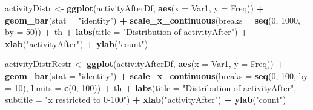 \documentclass[10pt,]{scrartcl}
\newenvironment{Shaded}{\begin{snugshade}}{\end{snugshade}}
\newcommand{\KeywordTok}[1]{\textcolor[rgb]{0.13,0.29,0.53}{\textbf{#1}}}
\newcommand{\DataTypeTok}[1]{\textcolor[rgb]{0.13,0.29,0.53}{#1}}
\newcommand{\DecValTok}[1]{\textcolor[rgb]{0.00,0.00,0.81}{#1}}
\newcommand{\StringTok}[1]{\textcolor[rgb]{0.31,0.60,0.02}{#1}}
\newcommand{\OperatorTok}[1]{\textcolor[rgb]{0.81,0.36,0.00}{\textbf{#1}}}
\newcommand{\NormalTok}[1]{#1}
\begin{document}
\begin{Shaded}
\begin{Highlighting}[]
\NormalTok{activityDistr <-}\StringTok{ }\KeywordTok{ggplot}\NormalTok{(activityAfterDf, }\KeywordTok{aes}\NormalTok{(}\DataTypeTok{x =}\NormalTok{ Var1, }\DataTypeTok{y =}\NormalTok{ Freq)) }\OperatorTok{+}
\StringTok{    }\KeywordTok{geom_bar}\NormalTok{(}\DataTypeTok{stat =} \StringTok{"identity"}\NormalTok{) }\OperatorTok{+}\StringTok{ }\KeywordTok{scale_x_continuous}\NormalTok{(}\DataTypeTok{breaks =} \KeywordTok{seq}\NormalTok{(}\DecValTok{0}\NormalTok{,}
    \DecValTok{1000}\NormalTok{, }\DataTypeTok{by =} \DecValTok{50}\NormalTok{)) }\OperatorTok{+}\StringTok{ }\NormalTok{th }\OperatorTok{+}\StringTok{ }\KeywordTok{labs}\NormalTok{(}\DataTypeTok{title =} \StringTok{"Distribution of activityAfter"}\NormalTok{) }\OperatorTok{+}
\StringTok{    }\KeywordTok{xlab}\NormalTok{(}\StringTok{"activityAfter"}\NormalTok{) }\OperatorTok{+}\StringTok{ }\KeywordTok{ylab}\NormalTok{(}\StringTok{"count"}\NormalTok{)}

\NormalTok{activityDistrRestr <-}\StringTok{ }\KeywordTok{ggplot}\NormalTok{(activityAfterDf, }\KeywordTok{aes}\NormalTok{(}\DataTypeTok{x =}\NormalTok{ Var1, }\DataTypeTok{y =}\NormalTok{ Freq)) }\OperatorTok{+}
\StringTok{    }\KeywordTok{geom_bar}\NormalTok{(}\DataTypeTok{stat =} \StringTok{"identity"}\NormalTok{) }\OperatorTok{+}\StringTok{ }\KeywordTok{scale_x_continuous}\NormalTok{(}\DataTypeTok{breaks =} \KeywordTok{seq}\NormalTok{(}\DecValTok{0}\NormalTok{,}
    \DecValTok{100}\NormalTok{, }\DataTypeTok{by =} \DecValTok{10}\NormalTok{), }\DataTypeTok{limits =} \KeywordTok{c}\NormalTok{(}\DecValTok{0}\NormalTok{, }\DecValTok{100}\NormalTok{)) }\OperatorTok{+}\StringTok{ }\NormalTok{th }\OperatorTok{+}\StringTok{ }\KeywordTok{labs}\NormalTok{(}\DataTypeTok{title =} \StringTok{"Distribution of activityAfter"}\NormalTok{,}
    \DataTypeTok{subtitle =} \StringTok{"x restricted to 0-100"}\NormalTok{) }\OperatorTok{+}\StringTok{ }\KeywordTok{xlab}\NormalTok{(}\StringTok{"activityAfter"}\NormalTok{) }\OperatorTok{+}
\StringTok{    }\KeywordTok{ylab}\NormalTok{(}\StringTok{"count"}\NormalTok{)}
\end{Highlighting}
\end{Shaded}

\normalsize
\end{document}
